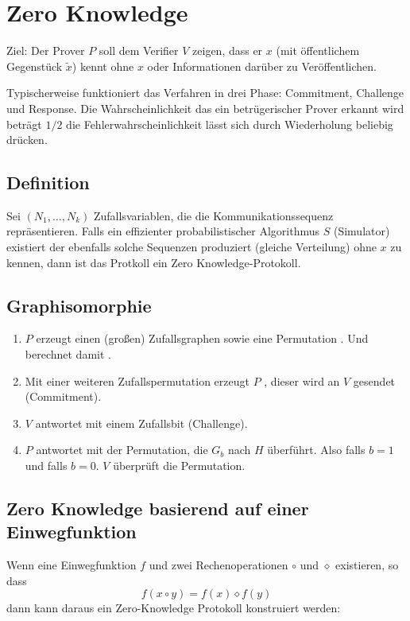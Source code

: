 \chapter{Zero Knowledge}
Ziel: Der Prover $P$ soll dem Verifier $V$ zeigen, dass er $x
$ (mit öffentlichem Gegenstück $\tilde{x}$) kennt ohne $x$ oder Informationen darüber 
zu Veröffentlichen.

Typischerweise funktioniert das Verfahren in drei Phase: Commitment, Challenge und 
Response. Die Wahrscheinlichkeit das ein betrügerischer Prover erkannt wird beträgt
$1/2$ die Fehlerwahrscheinlichkeit lässt sich durch Wiederholung beliebig drücken.

\section{Definition}
Sei $(N_1, \ldots, N_k)$ Zufallsvariablen, die die Kommunikationssequenz repräsentieren.
Falls ein effizienter probabilistischer Algorithmus $S$ (Simulator) existiert der 
ebenfalls solche Sequenzen produziert (gleiche Verteilung) ohne $x$ zu kennen,
dann ist das Protkoll ein Zero Knowledge-Protokoll.

\section{Graphisomorphie}
\begin{enumerate}
    \item
        $P$ erzeugt einen (großen) Zufallsgraphen  sowie
        eine Permutation \priv{$\pi$}. Und berechnet damit .
    \item
        Mit einer weiteren Zufallspermutation \priv{$\sigma$} erzeugt $P$
        , dieser wird an $V$ gesendet (Commitment).
    \item
        $V$ antwortet mit einem Zufallsbit  (Challenge).
    \item
        $P$ antwortet mit der Permutation, die $G_b$ nach $H$ überführt. Also
        \pub{$\sigma$} falls $b=1$ und \pub{$\pi \circ \sigma$} falls $b=0$.
        $V$ überprüft die Permutation.
\end{enumerate}

\section{Zero Knowledge basierend auf einer Einwegfunktion}
Wenn eine Einwegfunktion $f$ und zwei Rechenoperationen $\circ$ und $\diamond$ existieren,
so dass
\begin{equation}
    f(x \circ y) = f(x) \diamond f(y)
\end{equation}
dann kann daraus ein Zero-Knowledge Protokoll konstruiert werden:

